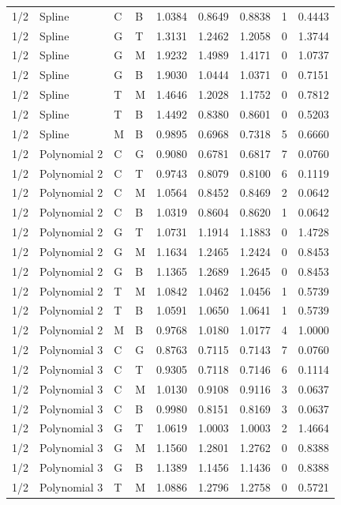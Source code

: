 \begin{longtable}{llllrrrrr}
1/2 & Spline & C & B & 1.0384 & 0.8649 & 0.8838 & 1 & 0.4443 \\
1/2 & Spline & G & T & 1.3131 & 1.2462 & 1.2058 & 0 & 1.3744 \\
1/2 & Spline & G & M & 1.9232 & 1.4989 & 1.4171 & 0 & 1.0737 \\
1/2 & Spline & G & B & 1.9030 & 1.0444 & 1.0371 & 0 & 0.7151 \\
1/2 & Spline & T & M & 1.4646 & 1.2028 & 1.1752 & 0 & 0.7812 \\
1/2 & Spline & T & B & 1.4492 & 0.8380 & 0.8601 & 0 & 0.5203 \\
1/2 & Spline & M & B & 0.9895 & 0.6968 & 0.7318 & 5 & 0.6660 \\
1/2 & Polynomial 2 & C & G & 0.9080 & 0.6781 & 0.6817 & 7 & 0.0760 \\
1/2 & Polynomial 2 & C & T & 0.9743 & 0.8079 & 0.8100 & 6 & 0.1119 \\
1/2 & Polynomial 2 & C & M & 1.0564 & 0.8452 & 0.8469 & 2 & 0.0642 \\
1/2 & Polynomial 2 & C & B & 1.0319 & 0.8604 & 0.8620 & 1 & 0.0642 \\
1/2 & Polynomial 2 & G & T & 1.0731 & 1.1914 & 1.1883 & 0 & 1.4728 \\
1/2 & Polynomial 2 & G & M & 1.1634 & 1.2465 & 1.2424 & 0 & 0.8453 \\
1/2 & Polynomial 2 & G & B & 1.1365 & 1.2689 & 1.2645 & 0 & 0.8453 \\
1/2 & Polynomial 2 & T & M & 1.0842 & 1.0462 & 1.0456 & 1 & 0.5739 \\
1/2 & Polynomial 2 & T & B & 1.0591 & 1.0650 & 1.0641 & 1 & 0.5739 \\
1/2 & Polynomial 2 & M & B & 0.9768 & 1.0180 & 1.0177 & 4 & 1.0000 \\
1/2 & Polynomial 3 & C & G & 0.8763 & 0.7115 & 0.7143 & 7 & 0.0760 \\
1/2 & Polynomial 3 & C & T & 0.9305 & 0.7118 & 0.7146 & 6 & 0.1114 \\
1/2 & Polynomial 3 & C & M & 1.0130 & 0.9108 & 0.9116 & 3 & 0.0637 \\
1/2 & Polynomial 3 & C & B & 0.9980 & 0.8151 & 0.8169 & 3 & 0.0637 \\
1/2 & Polynomial 3 & G & T & 1.0619 & 1.0003 & 1.0003 & 2 & 1.4664 \\
1/2 & Polynomial 3 & G & M & 1.1560 & 1.2801 & 1.2762 & 0 & 0.8388 \\
1/2 & Polynomial 3 & G & B & 1.1389 & 1.1456 & 1.1436 & 0 & 0.8388 \\
1/2 & Polynomial 3 & T & M & 1.0886 & 1.2796 & 1.2758 & 0 & 0.5721 \\

\end{longtable}

